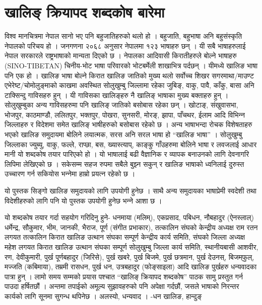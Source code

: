 \documentclass[oldfontcommands,oneside,a4paper,11pt]{article}
\begin{document}
 


\section{खालिङ् क्रियापद शब्दकोष बारेमा}
विश्व मानचित्रमा नेपाल सानो भए पनि बहुजातिहरुको थलो हो । बहुजाति, बहुभाषा अनि बहुसंस्कृति नेपालको परिचय हो । जनगणना २०६८ अनुसार नेपालमा १२३ भाषाहरु छन् । यी सबै भाषाहरुलाई नेपाल सरकारले राष्ट्रभाषाको मान्यता दिएको छ । नेपालका आदिवासी किरातीहरुले बोल्‍ने भाषाहरु (SINO-TIBETAN) चिनीय-भोट भाषा परिवारको भोटबर्मेली शाखाभित्र पर्दछन् । यीमध्ये खालिङ भाषा पनि एक हो । खालिङ भाषा बोल्‍ने किरात खालिङ जातिको मुख्य थलो सर्वोच्‍च शिखर सगरमाथा/माउण्ट एभेरेष्ट/चोमोलुङ्‍माको  काखमा अवस्थित सोलुखुम्बु जिल्‍लामा रहेका जुबिङ्, वाकु, पावै, काँकु, बासा अनि टाक्सिन्दु गा‍‍विसहरु हुन् । यी गाविसका खालिङ्‍हरु नै खालिङ् भाषाका मुख्य बक्ताहरु हुन् । सोलुखुम्बुका अन्य गाविसहरुमा पनि खालिङ् जातिको बसोबास रहेका छन् । खोटाङ्, संखुवासभा, भोजपुर, काठमाण्डौ, ललितपुर, भक्तपुर, पोखरा, सुनसरी, मोरङ्, झापा, पाँचथर, ईलाम आदि विभिन्‍न जिल्‍लाहरु र विदेशमा समेत खालिङ् भाषीहरुको बसोबास रहेको छ । 
अन्य भाषाभन्दा रोचक विशेषताहरु भएको खालिङ समुदायमा बोलिने लयात्मक, सरस अनि सरल भाषा हो “खालिङ भाषा” । सोलुखुम्बु जिल्‍लाका ज्युब्यु, वाकु, फल्‍ले, राप्छा, बस, ख्यास्त्याप्, काङ्‍कु गाँउहरुमा बोलिने भाषा र लवजलाई आधार मानी यो शब्दकोष तयार पारिएको हो । यो भाषालाई बढी वैज्ञानिक र व्यापक बनाउनको लागि देवनागरि लिपिमा लेखिएको छ । सकेसम्म सहज रुपमा सबैले बुझ्‍न सकुन् र खालिङ भाषाको ध्वनिलाई दुरुस्त उच्‍चारण गर्न सकियोस भन्‍नेमा हाम्रो प्रयत्‍न रहेको छ । 

यो पुस्तक सिङ्‍गो खालिङ समुदायको लागि उपयोगी हुनेछ । साथै अन्य समुदायका भाषाप्रेमी स्वदेशी तथा विदेशीहरुको लागि पनि यो पुस्तक उपयोगी हुनेछ भन्‍ने आशा छ । 

यो शब्दकोष तयार गर्दा सहयोग गरिदिनु हुने- धनमाया (मलिम्), एकप्रसाद, पबिधन, नौबहादुर (ऐनस्लाल्) धर्मेन्द्र, सौकुमार, भीम, जानकी, भैराज, पूर्ण (संगीत प्रभाकार), तत्कालिन संघको केन्द्रीय अध्यक्ष राम रतन लगयत तत्कालिन किरात खालिङ उत्थान संघका सम्पूर्ण केन्द्रीय कार्य समिति, संघको जिल्‍ला अध्यक्ष महेश लगयत किरात खालिङ उत्थान संघका सम्पूर्ण सोलुखुम्बु जिल्‍ला कार्य समिति, स्थानीयबासी आशवीर, रण, देवीकुमारी, पुर्ख पूर्णबहादुर (जिरिसे), पुर्ख खबरे, पुर्ख बिजमे, पुर्ख छत्रमान, पुर्ख देउनस्, बिजम्‌फुल्, मज्जति (कबिमाया), तम्रमी रासधन, पुर्ख धन, उत्रबहादुर (फोङ्‍साइला) आदि खालिङ पुर्खहरु धन्यवादका पात्रा हुन् ।
लामो समय सम्मको प्रयास पश्चात “खालिङ् क्रियापद शब्दकोष” पाठक सामु प्रस्तुत गर्न पाउदा हर्षितछौं । अन्तमा तपाईको अमूल्य सुझावहरुको पनि अपेक्षा गर्दछौं, जसले भाषाको निरन्तर कार्यको लागि सूनमा सुगन्ध थपिनेछ ।
अलस्यो, धन्यवाद ।
-धन खालिङ, हान्दुङ् 
\end{document}
